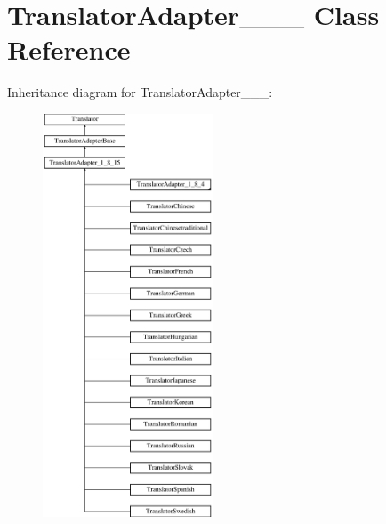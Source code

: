 \hypertarget{class_translator_adapter__1__8__15}{}\section{Translator\+Adapter\+\_\+\_\+\_ Class Reference}
\label{class_translator_adapter__1__8__15}
Inheritance diagram for Translator\+Adapter\+\_\+\_\+\_\+:\begin{figure}[H]
\begin{center}
\leavevmode
\includegraphics[height=12.000000cm]{class_translator_adapter__1__8__15}
\end{center}
\end{figure}
